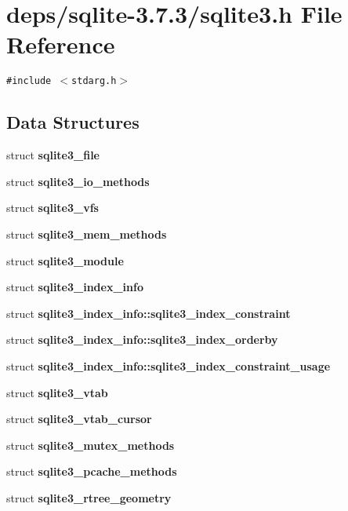 \section{deps/sqlite-3.7.3/sqlite3.h File Reference}
\label{3_87_83_2sqlite3_8h}
{\tt \#include $<$stdarg.h$>$}\par
\subsection*{Data Structures}
\begin{CompactItemize}
\item 
struct \bf{sqlite3\_\-file}
\item 
struct \bf{sqlite3\_\-io\_\-methods}
\item 
struct \bf{sqlite3\_\-vfs}
\item 
struct \bf{sqlite3\_\-mem\_\-methods}
\item 
struct \bf{sqlite3\_\-module}
\item 
struct \bf{sqlite3\_\-index\_\-info}
\item 
struct \bf{sqlite3\_\-index\_\-info::sqlite3\_\-index\_\-constraint}
\item 
struct \bf{sqlite3\_\-index\_\-info::sqlite3\_\-index\_\-orderby}
\item 
struct \bf{sqlite3\_\-index\_\-info::sqlite3\_\-index\_\-constraint\_\-usage}
\item 
struct \bf{sqlite3\_\-vtab}
\item 
struct \bf{sqlite3\_\-vtab\_\-cursor}
\item 
struct \bf{sqlite3\_\-mutex\_\-methods}
\item 
struct \bf{sqlite3\_\-pcache\_\-methods}
\item 
struct \bf{sqlite3\_\-rtree\_\-geometry}
\end{CompactItemize}
